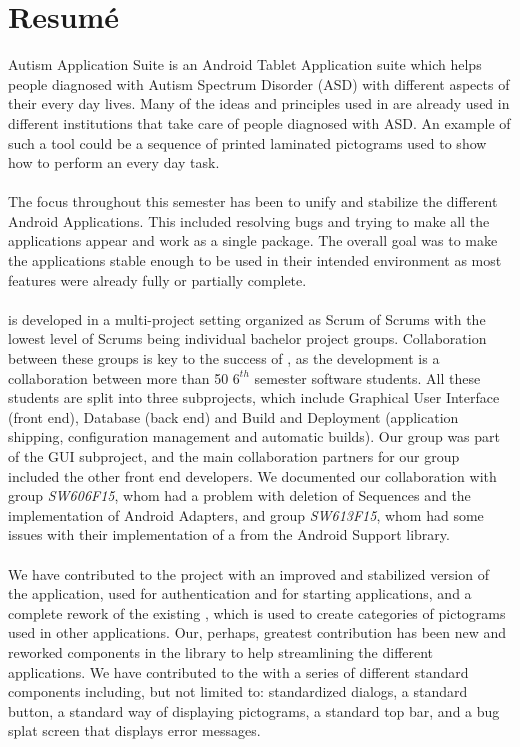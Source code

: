 \chapter{Resumé}

\giraf Autism Application Suite is an Android Tablet Application suite which helps people diagnosed with Autism Spectrum Disorder (ASD) with different aspects of their every day lives. Many of the ideas and principles used in \giraf are already used in different institutions that take care of people diagnosed with ASD. An example of such a tool could be a sequence of printed laminated pictograms used to show how to perform an every day task.
\\\\
The focus throughout this semester has been to unify and stabilize the different \giraf Android Applications. This included resolving bugs and trying to make all the applications appear and work as a single package. The overall goal was to make the applications stable enough to be used in their intended environment as most features were already fully or partially complete.  
\\\\
\giraf is developed in a multi-project setting organized as Scrum of Scrums with the lowest level of Scrums being individual bachelor project groups. Collaboration between these groups is key to the success of \giraf, as the development is a collaboration between more than 50 $6^{th}$ semester software students. All these students are split into three subprojects, which include Graphical User Interface (front end), Database (back end) and Build and Deployment (application shipping, configuration management and automatic builds). Our group was part of the GUI subproject, and the main collaboration partners for our group included the other front end developers. We documented our collaboration with group \emph{SW606F15}, whom had a problem with deletion of \giraf Sequences and the implementation of Android Adapters, and group \emph{SW613F15}, whom had some issues with their implementation of a  from the Android Support library. 
\\\\
We have contributed to the project with an improved and stabilized version of the \giraf \launcher application, used for authentication and for starting \giraf applications, and a complete rework of the existing \giraf \ct, which is used to create categories of pictograms used in other applications. Our, perhaps, greatest contribution has been new and reworked components in the \gc library to help streamlining the different applications. We have contributed to the \gc with a series of different standard components including, but not limited to: standardized dialogs, a standard button, a standard way of displaying pictograms, a standard top bar, and a bug splat screen that displays error messages.
